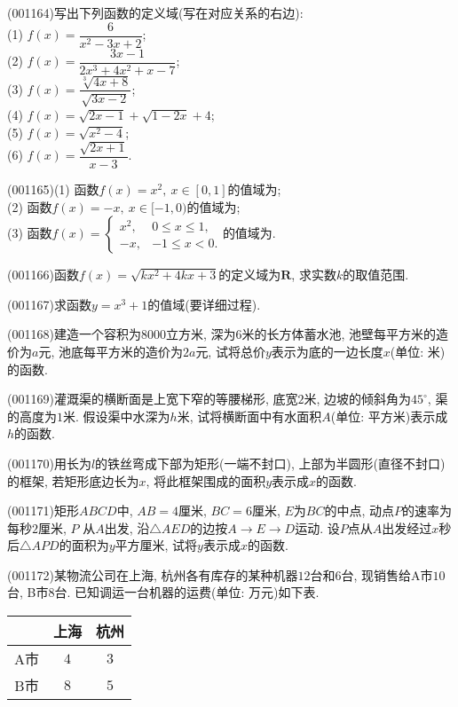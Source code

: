 \item (001164)写出下列函数的定义域(写在对应关系的右边):\\ 
(1) $f(x)=\dfrac{6}{x^2-3x+2}$;\\ 
(2) $f(x)=\dfrac{3x-1}{2x^3+4x^2+x-7}$;\\ 
(3) $f(x)=\dfrac{\sqrt[3]{4x+8}}{\sqrt{3x-2}}$;\\ 
(4) $f(x)=\sqrt{2x-1}+\sqrt{1-2x}+4$;\\ 
(5) $f(x)=\sqrt{x^2-4}$;\\ 
(6) $f(x)=\dfrac{\sqrt{2x+1}}{x-3}$.
\item (001165)(1) 函数$f(x)=x^2, \ x \in [0,1]$的值域为;\\ 
(2) 函数$f(x)=-x, \ x \in [-1,0)$的值域为;\\ 
(3) 函数$f(x)=\left\{\begin{array}{cc}x^2,&0\le x\le 1,\\-x,&-1\le x<0.\end{array}\right.$的值域为.
\item (001166)函数$f(x)=\sqrt{kx^2+4kx+3}$的定义域为$\mathbf{R}$, 求实数$k$的取值范围.
\item (001167)求函数$y=x^3+1$的值域(要详细过程).
\item (001168)建造一个容积为$8000$立方米, 深为$6$米的长方体蓄水池, 池壁每平方米的造价为$a$元, 池底每平方米的造价为$2a$元, 试将总价$y$表示为底的一边长度$x$(单位: 米)的函数.
\item (001169)灌溉渠的横断面是上宽下窄的等腰梯形, 底宽$2$米, 边坡的倾斜角为$45^\circ$, 渠的高度为$1$米. 假设渠中水深为$h$米, 试将横断面中有水面积$A$(单位: 平方米)表示成$h$的函数.
\item (001170)用长为$l$的铁丝弯成下部为矩形(一端不封口), 上部为半圆形(直径不封口)的框架, 若矩形底边长为$x$, 将此框架围成的面积$y$表示成$x$的函数.
\item (001171)矩形$ABCD$中, $AB=4$厘米, $BC=6$厘米, $E$为$BC$的中点, 动点$P$的速率为每秒$2$厘米, $P$
从$A$出发, 沿$\triangle AED$的边按$A\rightarrow E\rightarrow D$运动. 设$P$点从$A$出发经过$x$秒后$\triangle APD$的面积为$y$平方厘米, 试将$y$表示成$x$的函数.
\item (001172)某物流公司在上海, 杭州各有库存的某种机器$12$台和$6$台, 现销售给A市$10$台, B市$8$台. 已知调运一台机器的运费(单位: 万元)如下表.
\begin{center}\begin{tabular}{c|cc}
&上海& 杭州\\
\hline
A市 & $4$ & $3$\\
B市 & $8$ & $5$
\end{tabular}\end{center}

